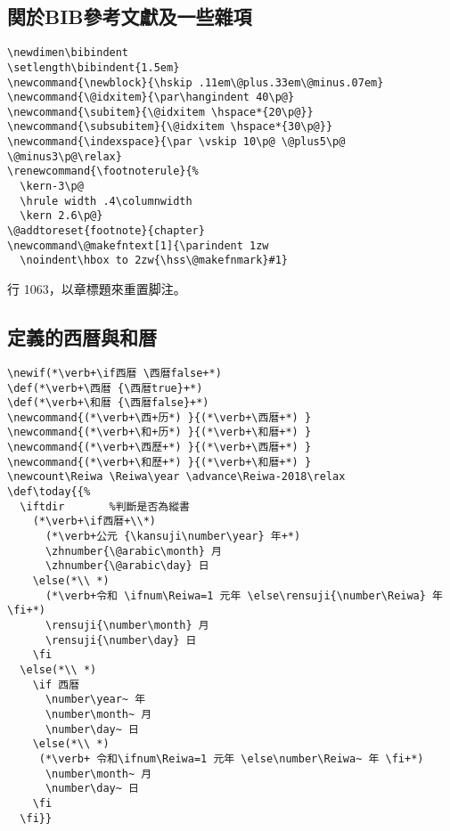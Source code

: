 \subsection{関於BIB參考文獻及一些雜項}

\begin{lstlisting}[firstnumber=1052]
\newdimen\bibindent
\setlength\bibindent{1.5em}
\newcommand{\newblock}{\hskip .11em\@plus.33em\@minus.07em}
\newcommand{\@idxitem}{\par\hangindent 40\p@}
\newcommand{\subitem}{\@idxitem \hspace*{20\p@}}
\newcommand{\subsubitem}{\@idxitem \hspace*{30\p@}}
\newcommand{\indexspace}{\par \vskip 10\p@ \@plus5\p@ \@minus3\p@\relax}
\renewcommand{\footnoterule}{%
  \kern-3\p@
  \hrule width .4\columnwidth
  \kern 2.6\p@}
\@addtoreset{footnote}{chapter}
\newcommand\@makefntext[1]{\parindent 1zw
  \noindent\hbox to 2zw{\hss\@makefnmark}#1}
\end{lstlisting}

\par 行 1063，以章標題來重置脚注。


\subsection{定義的西暦與和暦}

\begin{lstlisting}[firstnumber=1068]
\newif(*\verb+\if西暦 \西暦false+*)
\def(*\verb+\西暦 {\西暦true}+*)
\def(*\verb+\和暦 {\西暦false}+*)
\newcommand{(*\verb+\西+历*) }{(*\verb+\西暦+*) }
\newcommand{(*\verb+\和+历*) }{(*\verb+\和暦+*) }
\newcommand{(*\verb+\西歷+*) }{(*\verb+\西暦+*) }
\newcommand{(*\verb+\和歷+*) }{(*\verb+\和暦+*) }
\newcount\Reiwa \Reiwa\year \advance\Reiwa-2018\relax
\def\today{{%
  \iftdir		%判斷是否為縱書
    (*\verb+\if西暦+\\*)
      (*\verb+公元 {\kansuji\number\year} 年+*)
      \zhnumber{\@arabic\month} 月
      \zhnumber{\@arabic\day} 日
    \else(*\\ *)
      (*\verb+令和 \ifnum\Reiwa=1 元年 \else\rensuji{\number\Reiwa} 年 \fi+*)
      \rensuji{\number\month} 月
      \rensuji{\number\day} 日
    \fi
  \else(*\\ *)
    \if 西暦
      \number\year~ 年
      \number\month~ 月
      \number\day~ 日
    \else(*\\ *)
     (*\verb+ 令和\ifnum\Reiwa=1 元年 \else\number\Reiwa~ 年 \fi+*)
      \number\month~ 月
      \number\day~ 日
    \fi
  \fi}}
\end{lstlisting}

